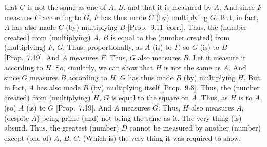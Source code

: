 \begin{Parallel}{}{}
{that $G$ is not the same as one of $A$, $B$, and that it is measured by $A$. 
And since $F$ measures $C$ according to $G$, $F$ has thus made
$C$ (by) multiplying $G$.  But, in fact, $A$ has
also made $C$ (by) multiplying $B$ [Prop.~9.11~corr.]. Thus, the (number created) from (multiplying)
$A$, $B$ is equal to  the (number created) from (multiplying) $F$, $G$.
Thus, proportionally, as $A$ (is) to $F$, so $G$ (is) to $B$ [Prop.~7.19]. And $A$ measures $F$. 
Thus, $G$ also measures $B$.
Let it measure
it according to $H$. So, similarly, we can show that $H$ is not the same as $A$. And since $G$ measures $B$ according to $H$, $G$ has thus made $B$
(by) multiplying $H$.  But, in fact, $A$ has
 also made $B$ (by) multiplying itself [Prop.~9.8]. Thus, the (number created) from (multiplying)
$H$, $G$ is equal to  the square on $A$. Thus, as $H$ is to $A$, (so) $A$ (is) to $G$ [Prop.~7.19]. And $A$ measures $G$.
Thus, $H$ also measures $A$, (despite $A$) being prime (and) not being  the same as it. The very thing (is) absurd. Thus, the greatest (number) $D$ cannot be
measured by  another (number) except (one of) $A$, $B$, $C$. (Which is) the
very thing it was required to show.}
\end{Parallel}

